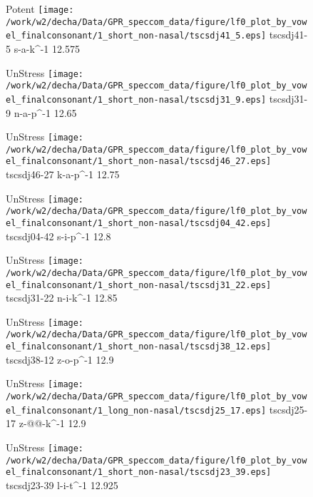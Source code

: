 \documentclass{article}
\begin{document}
\begin{figure}[t]
\begin{minipage}[b]{.24\textwidth}
\colorbox{Apricot}{Potent}
\centering
\texttt{[image: /work/w2/decha/Data/GPR\_speccom\_data/figure/lf0\_plot\_by\_vowel\_finalconsonant/1\_short\_non-nasal/tscsdj41\_5.eps]}
tscsdj41-5 s-a-k\textasciicircum-1 12.575
\end{minipage}
\begin{minipage}[b]{.24\textwidth}
UnStress
\centering
\texttt{[image: /work/w2/decha/Data/GPR\_speccom\_data/figure/lf0\_plot\_by\_vowel\_finalconsonant/1\_short\_non-nasal/tscsdj31\_9.eps]}
tscsdj31-9 n-a-p\textasciicircum-1 12.65
\end{minipage}
\begin{minipage}[b]{.24\textwidth}
UnStress
\centering
\texttt{[image: /work/w2/decha/Data/GPR\_speccom\_data/figure/lf0\_plot\_by\_vowel\_finalconsonant/1\_short\_non-nasal/tscsdj46\_27.eps]}
tscsdj46-27 k-a-p\textasciicircum-1 12.75
\end{minipage}
\begin{minipage}[b]{.24\textwidth}
UnStress
\centering
\texttt{[image: /work/w2/decha/Data/GPR\_speccom\_data/figure/lf0\_plot\_by\_vowel\_finalconsonant/1\_short\_non-nasal/tscsdj04\_42.eps]}
tscsdj04-42 s-i-p\textasciicircum-1 12.8
\end{minipage}
\end{figure}
\clearpage
\begin{figure}[t]
\begin{minipage}[b]{.24\textwidth}
UnStress
\centering
\texttt{[image: /work/w2/decha/Data/GPR\_speccom\_data/figure/lf0\_plot\_by\_vowel\_finalconsonant/1\_short\_non-nasal/tscsdj31\_22.eps]}
tscsdj31-22 n-i-k\textasciicircum-1 12.85
\end{minipage}
\begin{minipage}[b]{.24\textwidth}
UnStress
\centering
\texttt{[image: /work/w2/decha/Data/GPR\_speccom\_data/figure/lf0\_plot\_by\_vowel\_finalconsonant/1\_short\_non-nasal/tscsdj38\_12.eps]}
tscsdj38-12 z-o-p\textasciicircum-1 12.9
\end{minipage}
\begin{minipage}[b]{.24\textwidth}
UnStress
\centering
\texttt{[image: /work/w2/decha/Data/GPR\_speccom\_data/figure/lf0\_plot\_by\_vowel\_finalconsonant/1\_long\_non-nasal/tscsdj25\_17.eps]}
tscsdj25-17 z-@@-k\textasciicircum-1 12.9
\end{minipage}
\begin{minipage}[b]{.24\textwidth}
UnStress
\centering
\texttt{[image: /work/w2/decha/Data/GPR\_speccom\_data/figure/lf0\_plot\_by\_vowel\_finalconsonant/1\_short\_non-nasal/tscsdj23\_39.eps]}
tscsdj23-39 l-i-t\textasciicircum-1 12.925
\end{minipage}
\end{figure}
\end{document}
